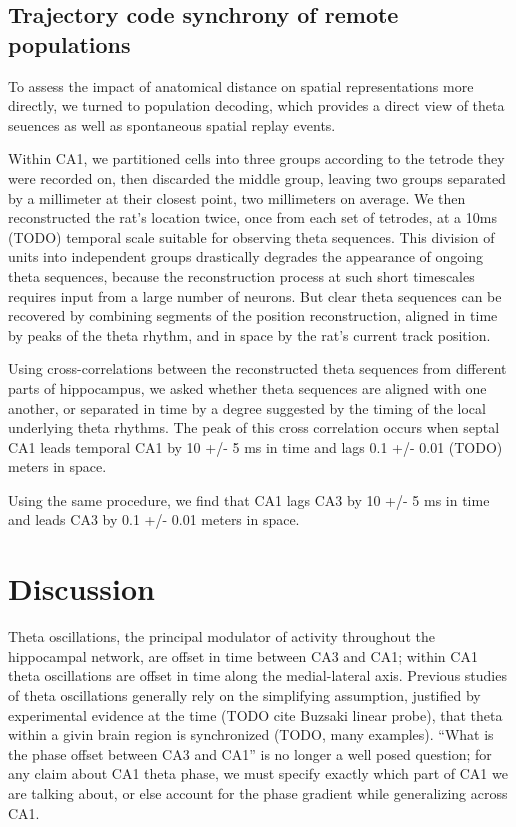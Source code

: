 \documentclass[10pt]{article}
\begin{document}
\subsection*{Trajectory code synchrony of remote populations}
To assess the impact of anatomical distance on spatial representations more directly, we turned to population decoding, which provides a direct view of theta seuences as well as spontaneous spatial replay events. 

Within CA1, we partitioned cells into three groups according to the tetrode they were recorded on, then discarded the middle group, leaving two groups separated by a millimeter at their closest point, two millimeters on average. We then reconstructed the rat's location twice, once from each set of tetrodes, at a 10ms (TODO) temporal scale suitable for observing theta sequences. This division of units into independent groups drastically degrades the appearance of ongoing theta sequences, because the reconstruction process at such short timescales requires input from a large number of neurons. But clear theta sequences can be recovered by combining segments of the position reconstruction, aligned in time by peaks of the theta rhythm, and in space by the rat's current track position.

Using cross-correlations between the reconstructed theta sequences from different parts of hippocampus, we asked whether theta sequences are aligned with one another, or separated in time by a degree suggested by the timing of the local underlying theta rhythms. The peak of this cross correlation occurs when septal CA1 leads temporal CA1 by 10 +/- 5 ms in time and lags 0.1 +/- 0.01 (TODO) meters in space.

Using the same procedure, we find that CA1 lags CA3 by 10 +/- 5 ms in time and leads CA3 by 0.1 +/- 0.01 meters in space.

\section*{Discussion}
Theta oscillations, the principal modulator of activity throughout the hippocampal network, are offset in time between CA3 and CA1; within CA1 theta oscillations are offset in time along the medial-lateral axis. Previous studies of theta oscillations generally rely on the simplifying assumption, justified by experimental evidence at the time (TODO cite Buzsaki linear probe), that theta within a givin brain region is synchronized (TODO, many examples). ``What is the phase offset between CA3 and CA1'' is no longer a well posed question; for any claim about CA1 theta phase, we must specify exactly which part of CA1 we are talking about, or else account for the phase gradient while generalizing across CA1.
\end{document}
